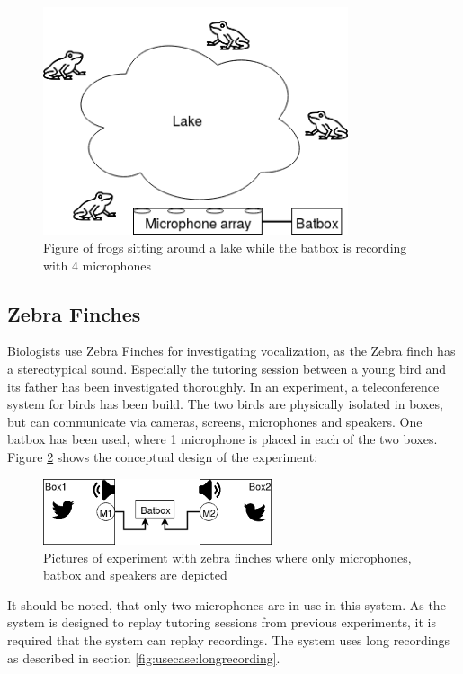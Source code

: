 \begin{figure}[H]
	\centering
	\includegraphics[width=0.8\textwidth]{figures/usecases_frogs}
	\caption{Figure of frogs sitting around a lake while the batbox is recording with 4 microphones} \label{fig:usecase:frogs}
\end{figure}



\subsection{Zebra Finches}
Biologists use Zebra Finches for investigating vocalization, as the Zebra finch has a stereotypical sound. Especially the tutoring session between a young bird and its father has been investigated thoroughly. In an experiment, a teleconference system for birds has been build. The two birds are physically isolated in boxes,
but can communicate via cameras, screens, microphones and speakers. One batbox has been used, where 1 microphone is placed in each of the two boxes.\citep{larsen2016system}
Figure \ref{fig:usecases:zebra:overview} shows the conceptual design of the experiment:

\begin{figure}[h!]
	\centering
	\includegraphics[width=0.6\textwidth]{figures/zebrafinches_experiment1.png}
	\caption{Pictures of experiment with zebra finches where only microphones, batbox and speakers are depicted}\label{fig:usecases:zebra:overview}
\end{figure}
It should be noted, that only two microphones are in use in this system.
As the system is designed to replay tutoring sessions from previous experiments, it is required that the system can replay recordings.
The system uses long recordings as described in section \ref{fig:usecase:longrecording}.


